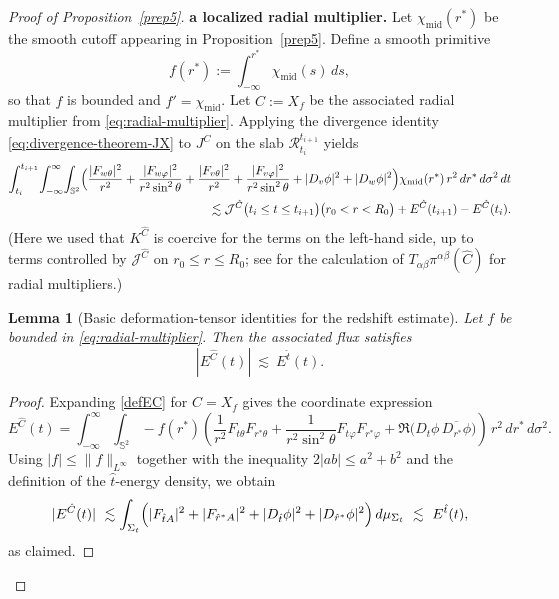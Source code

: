 \documentclass[11pt]{article}
\numberwithin{equation}{section}
\theoremstyle{plain}
\newtheorem{lemma}[theorem]{Lemma}
\theoremstyle{definition}
\theoremstyle{remark}
\begin{document}
\begin{proof}[Proof of Proposition~\ref{prep5}]
\medskip
\noindent\textbf{a localized radial multiplier.}
Let $\chi_{\mathrm{mid}}(r^{\ast})$ be the smooth cutoff appearing in Proposition~\ref{prep5}.
Define a smooth primitive
\begin{equation}\label{cut}
f(r^{\ast})
:=
\int_{-\infty}^{r^{\ast}}\chi_{\mathrm{mid}}(s)\,ds,
\end{equation}
so that $f$ is bounded and $f'=\chi_{\mathrm{mid}}$.
Let $\hat C:=X_{f}$ be the associated radial multiplier from \eqref{eq:radial-multiplier}.
Applying the divergence identity \eqref{eq:divergence-theorem-JX} to $J^{\hat C}$ on the slab $\mathcal R_{t_i}^{t_{i+1}}$ yields
\begin{eqnarray}\label{esIH}
\int_{t_i}^{t_{i+1}}\!\int_{-\infty}^{\infty}\!\int_{\mathbb S^{2}}
\Bigl(
\frac{|F_{w\theta}|^{2}}{r^{2}}+\frac{|F_{w\varphi}|^{2}}{r^{2}\sin^{2}\theta}
+\frac{|F_{v\theta}|^{2}}{r^{2}}+\frac{|F_{v\varphi}|^{2}}{r^{2}\sin^{2}\theta}
+|D_{v}\phi|^{2}+|D_{w}\phi|^{2}
\Bigr)\chi_{\mathrm{mid}}(r^{\ast})\,r^{2}\,dr^{\ast}\,d\sigma^{2}\,dt
\nonumber\\
\lesssim
\mathcal{J}^{\hat{C}}\bigl(t_{i}\le t\le t_{i+1}\bigr)\bigl(r_{0}<r<R_{0}\bigr)
+E^{\hat{C}}(t_{i+1})-E^{\hat{C}}(t_{i}).
\end{eqnarray}
(Here we used that $K^{\hat C}$ is coercive for the terms on the left-hand side, up to terms controlled by $\mathcal J^{\hat C}$ on $r_{0}\le r\le R_{0}$; see \cite{mokdad} for the calculation of $T_{\alpha\beta}\pi^{\alpha\beta}(\hat C)$ for radial multipliers.)

\begin{lemma}[Basic deformation-tensor identities for the redshift estimate]\label{prep1}
Let $f$ be bounded in \eqref{eq:radial-multiplier}. Then the associated flux satisfies
\begin{equation}
|E^{\hat C}(t)|\ \lesssim\ E^{\hat t}(t).
\end{equation}
\end{lemma}

\begin{proof}
Expanding \eqref{defEC} for $\hat C=X_{f}$ gives the coordinate expression
\begin{equation}\label{EG}
E^{\hat C}(t)
=
\int_{-\infty}^{\infty}\!\int_{\mathbb S^{2}}
-f(r^{\ast})
\left(
\frac{1}{r^{2}}F_{t\theta}F_{r^{\ast}\theta}
+\frac{1}{r^{2}\sin^{2}\theta}F_{t\varphi}F_{r^{\ast}\varphi}
+\Re\bigl(D_{t}\phi\,\overline{D_{r^{\ast}}\phi}\bigr)
\right)\,r^{2}\,dr^{\ast}\,d\sigma^{2}.
\end{equation}
Using $|f|\le \|f\|_{L^\infty}$ together with the inequality $2|ab|\le a^{2}+b^{2}$ and the definition of the $\hat t$-energy density, we obtain
\begin{equation}
|E^{\hat C}(t)|
\ \lesssim
\int_{\Sigma_t}
\Bigl(|F_{\hat t A}|^{2}+|F_{\hat r^{\ast}A}|^{2}+|D_{\hat t}\phi|^{2}+|D_{\hat r^{\ast}}\phi|^{2}\Bigr)\,d\mu_{\Sigma_t}
\ \lesssim\ E^{\hat t}(t),
\end{equation}
as claimed.
\end{proof}


\end{proof}
\end{document}
